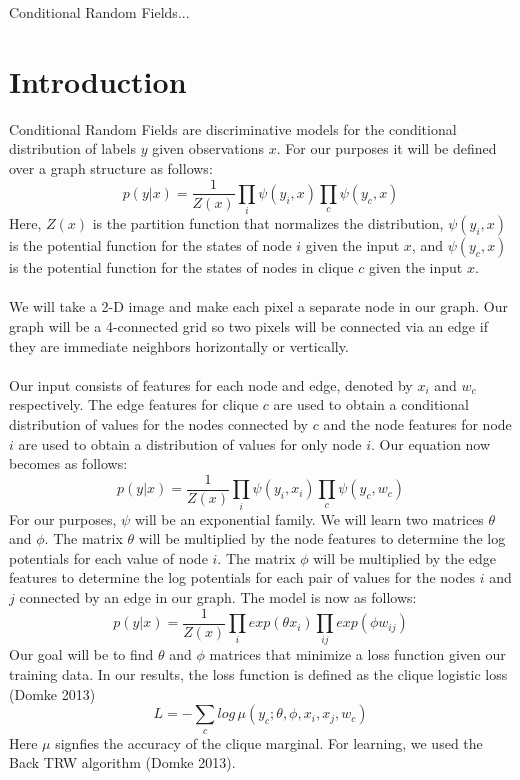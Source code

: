 


Conditional Random Fields...

\section{Introduction}

Conditional Random Fields are discriminative models for the conditional distribution of labels $y$ given observations $x$. For our purposes it will be defined over a graph structure as follows:
\[
p(y|x) = \frac{1}{Z(x)} \prod_i{\psi(y_i,x)} \prod_{c}{\psi(y_c,x)}
\]
Here, $Z(x)$ is the partition function that normalizes the distribution, $\psi(y_i,x)$ is the potential function for the states of node $i$ given the input $x$, and $\psi(y_c,x)$ is the potential function for the states of nodes in clique $c$ given the input $x$. \\
\\
We will take a 2-D image and make each pixel a separate node in our graph. Our graph will be a 4-connected grid so two pixels will be connected via an edge if they are immediate neighbors horizontally or vertically. \\
\\
Our input consists of features for each node and edge, denoted by $x_i$ and $w_c$ respectively. The edge features for clique $c$ are used to obtain a conditional distribution of values for the nodes connected by $c$ and the node features for node $i$ are used to obtain a distribution of values for only node $i$. Our equation now becomes as follows:
\[
p(y|x) = \frac{1}{Z(x)} \prod_i{\psi(y_i,x_i)} \prod_{c}{\psi(y_c,w_c)}
\]
For our purposes, $\psi$ will be an exponential family. We will learn two matrices $\theta$ and $\phi$. The matrix $\theta$ will be multiplied by the node features to determine the log potentials for each value of node $i$. The matrix $\phi$ will be multiplied by the edge features to determine the log potentials for each pair of values for the nodes $i$ and $j$ connected by an edge in our graph. The model is now as follows:
\[
p(y|x) = \frac{1}{Z(x)} \prod_i{exp(\theta x_i)} \prod_{ij}{exp(\phi w_{ij})}
\]
Our goal will be to find $\theta$ and $\phi$ matrices that minimize a loss function given our training data. In our results, the loss function is defined as the clique logistic loss (Domke 2013)
\[
L = - \sum_c {log \, \mu(y_c; \theta, \phi, x_i, x_j, w_c)}
\]
Here $\mu$ signfies the accuracy of the clique marginal. For learning, we used the Back TRW algorithm (Domke 2013).

